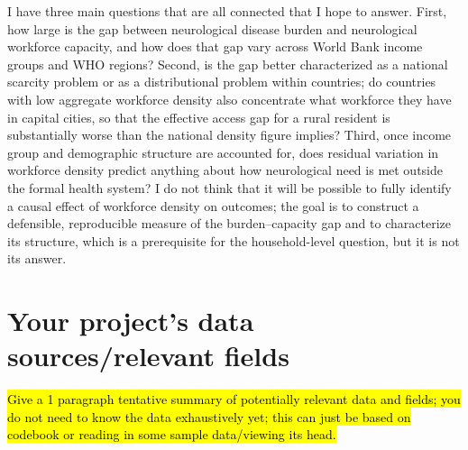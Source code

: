 \documentclass[12pt]{article}
\begin{document}
I have three main questions that are all connected that I hope to answer. First, how large is the
gap between neurological disease burden and neurological workforce capacity, and
how does that gap vary across World Bank income groups and WHO regions? Second,
is the gap better characterized as a national scarcity problem or as a
distributional problem within countries; do countries with low
aggregate workforce density also concentrate what workforce they have in capital
cities, so that the effective access gap for a rural resident is substantially
worse than the national density figure implies? Third, once income group and
demographic structure are accounted for, does residual variation in workforce
density predict anything about how neurological need is met outside the formal
health system? I do not think that it will be possible to fully identify a causal effect of workforce density
on outcomes; the goal is to construct a defensible, reproducible measure of
the burden--capacity gap and to characterize its structure, which is a
prerequisite for the household-level question, but it is not its answer.

\section{Your project's data sources/relevant fields}

\hl{Give a 1 paragraph tentative summary of potentially relevant data and fields; you do not need to know the data exhaustively yet; this can just be based on codebook or reading in some sample data/viewing its head.}
\end{document}
